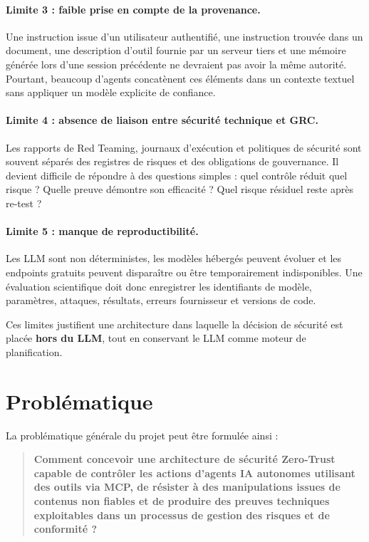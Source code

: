 \paragraph{Limite 3 : faible prise en compte de la provenance.}
Une instruction issue d'un utilisateur authentifié, une instruction trouvée dans un document, une description d'outil fournie par un serveur tiers et une mémoire générée lors d'une session précédente ne devraient pas avoir la même autorité. Pourtant, beaucoup d'agents concatènent ces éléments dans un contexte textuel sans appliquer un modèle explicite de confiance.

\paragraph{Limite 4 : absence de liaison entre sécurité technique et GRC.}
Les rapports de Red Teaming, journaux d'exécution et politiques de sécurité sont souvent séparés des registres de risques et des obligations de gouvernance. Il devient difficile de répondre à des questions simples : quel contrôle réduit quel risque ? Quelle preuve démontre son efficacité ? Quel risque résiduel reste après re-test ?

\paragraph{Limite 5 : manque de reproductibilité.}
Les LLM sont non déterministes, les modèles hébergés peuvent évoluer et les endpoints gratuits peuvent disparaître ou être temporairement indisponibles. Une évaluation scientifique doit donc enregistrer les identifiants de modèle, paramètres, attaques, résultats, erreurs fournisseur et versions de code.

Ces limites justifient une architecture dans laquelle la décision de sécurité est placée \textbf{hors du LLM}, tout en conservant le LLM comme moteur de planification.

\section{Problématique}

La problématique générale du projet peut être formulée ainsi :

\begin{quote}
\textbf{Comment concevoir une architecture de sécurité Zero-Trust capable de contrôler les actions d'agents IA autonomes utilisant des outils via MCP, de résister à des manipulations issues de contenus non fiables et de produire des preuves techniques exploitables dans un processus de gestion des risques et de conformité ?}
\end{quote}

